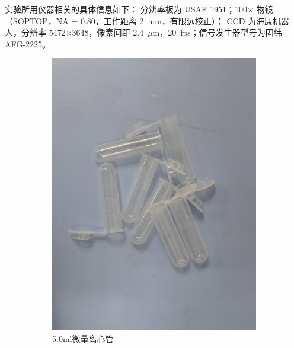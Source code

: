 \documentclass[a4paper]{report} %
\begin{document}
实验所用仪器相关的具体信息如下：
分辨率板为 USAF 1951；100$\times$ 物镜（SOPTOP，NA = 0.80，工作距离 2~mm，有限远校正）；
CCD 为海康机器人，分辨率 5472$\times$3648，像素间距 2.4~$\mu$m，20~fps；信号发生器型号为固纬 AFG-2225。
\begin{figure}[H]
    \centering
    \begin{subfigure}{0.22\textwidth}
        \includegraphics[width=\linewidth]{5.0ml微量离心管.jpg}
        \caption{5.0ml微量离心管}
    \end{subfigure}
    \begin{subfigure}{0.22\textwidth}

\end{subfigure}
\end{figure}
\end{document}
